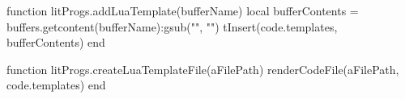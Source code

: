 
\startchapter[title=Lua Templates]

\startMkIVCode




\setuptyping[Template][option=lua]


\let\oldStopLuaTemplate=\stopLuaTemplate
\def\stopLuaTemplate{%
  \oldStopLuaTemplate%
  \directlua{thirddata.literateProgs.addLuaTemplate('_typing_')}}


\def\createTemplateFile[#1]{
  \directlua{thirddata.literateProgs.createLuaTemplateFile('#1')}
}

\stopMkIVCode

\startLuaCode

function litProgs.addLuaTemplate(bufferName)
  local bufferContents = buffers.getcontent(bufferName):gsub("", "\n")
  tInsert(code.templates, bufferContents)
end

function litProgs.createLuaTemplateFile(aFilePath)
  renderCodeFile(aFilePath, code.templates)
end

\stopLuaCode

\stopchapter
